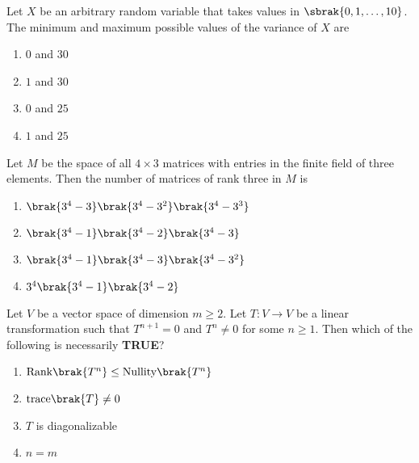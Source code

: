 \iffalse
                       
                        
                        
                        
                    
                        \author{AI24BTECH11006 - Bugada Roopansha}
                        \section{ma}
                        \chapter{2013}
                        \fi 
    \item Let $X$ be an arbitrary random variable that takes values in $\sbrak{0, 1, \dots, 10}$. The minimum and maximum possible values of the variance of $X$ are
    \begin{enumerate}
        \item $0$ and $30$
        \item $1$ and $30$
        \item $0$ and $25$
        \item $1$ and $25$
    \end{enumerate}

    \item Let $M$ be the space of all $4 \times 3$ matrices with entries in the finite field of three elements. Then the number of matrices of rank three in $M$ is
    \begin{enumerate}
        \item $\brak{3^4 - 3} \brak{3^{4} - 3^{2}} \brak{3^{4} - 3^{3}}$
        \item $\brak{3^4 - 1} \brak{3^4 - 2} \brak{3^4 - 3}$
        \item $\brak{3^4 -1} \brak{3^4 - 3} \brak{3^{4} - 3^{2}}$
        \item $3^4\brak{3^4 - 1} \brak{3^4 - 2}$
    \end{enumerate}

    \item Let $V$ be a vector space of dimension $m \geq 2$. Let $T: V \rightarrow V$ be a linear transformation such that $T^{n+1} = 0$ and $T^{n} \neq 0$ for some $n \geq 1$. Then which of the following is necessarily \textbf{TRUE}?
    \begin{enumerate}
        \item $\text{Rank} \brak{T^{n}} \leq \text{Nullity} \brak{T^{n}}$
        \item $\text{trace} \brak{T} \neq 0$
        \item $T$ is diagonalizable
        \item $n = m$
    \end{enumerate}

